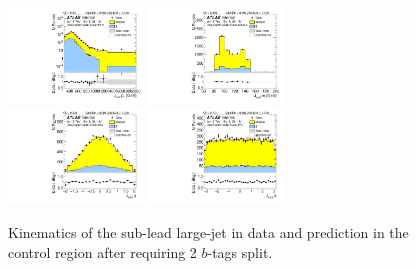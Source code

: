\begin{figure}[htbp!]
\begin{center}
\includegraphics[width=0.32\textwidth,angle=-90]{figures/boosted/Control/b77_TwoTag_split_Control_sublHCand_Pt_m_1.pdf}
\includegraphics[width=0.32\textwidth,angle=-90]{figures/boosted/Control/b77_TwoTag_split_Control_sublHCand_Mass_s.pdf}\\
\includegraphics[width=0.32\textwidth,angle=-90]{figures/boosted/Control/b77_TwoTag_split_Control_sublHCand_Eta.pdf}
\includegraphics[width=0.32\textwidth,angle=-90]{figures/boosted/Control/b77_TwoTag_split_Control_sublHCand_Phi.pdf}
  \caption{Kinematics of the sub-lead large-\R jet in data and prediction in the control region after requiring 2 $b$-tags split. }
  \label{fig:boosted-2bs-control-ak10-subl}
\end{center}
\end{figure}


